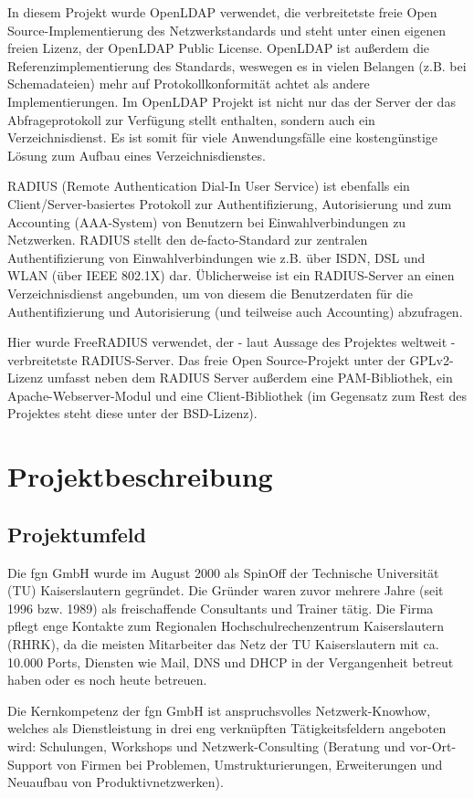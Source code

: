 \documentclass[11pt,a4paper,titlepage=firstiscover,headsepline]{scrartcl} %
\begin{document}
In diesem Projekt wurde OpenLDAP verwendet, die verbreitetste freie Open Source-Implementierung des Netzwerkstandards und steht unter einen eigenen freien Lizenz, der OpenLDAP Public License. OpenLDAP ist außerdem die Referenzimplementierung des Standards, weswegen es in vielen Belangen (z.B. bei Schemadateien) mehr auf Protokollkonformität achtet als andere Implementierungen. Im OpenLDAP Projekt ist nicht nur das der Server der das Abfrageprotokoll zur Verfügung stellt enthalten, sondern auch ein Verzeichnisdienst. Es ist somit für viele Anwendungsfälle eine kostengünstige Lösung zum Aufbau eines Verzeichnisdienstes.

RADIUS (Remote Authentication Dial-In User Service) ist ebenfalls ein Client/Server-basiertes Protokoll zur Authentifizierung, Autorisierung und zum Accounting (AAA-System) von Benutzern bei Einwahlverbindungen zu Netzwerken. RADIUS stellt den de-facto-Standard zur zentralen Authentifizierung von Einwahlverbindungen wie z.B. über ISDN, DSL und WLAN (über IEEE 802.1X) dar. Üblicherweise ist ein RADIUS-Server an einen Verzeichnisdienst angebunden, um von diesem die Benutzerdaten für die Authentifizierung und Autorisierung (und teilweise auch Accounting) abzufragen.

Hier wurde FreeRADIUS verwendet, der - laut Aussage des Projektes weltweit - verbreitetste RADIUS-Server. Das freie Open Source-Projekt unter der GPLv2-Lizenz umfasst neben dem RADIUS Server außerdem eine PAM-Bibliothek, ein Apache-Webserver-Modul und eine Client-Bibliothek (im Gegensatz zum Rest des Projektes steht diese unter der BSD-Lizenz).

\section{Projektbeschreibung}
\subsection{Projektumfeld}
Die fgn GmbH wurde im August 2000 als SpinOff der Technische Universität (TU) Kaiserslautern gegründet. Die Gründer waren zuvor mehrere Jahre (seit 1996 bzw. 1989) als freischaffende Consultants und Trainer tätig. Die Firma pflegt enge Kontakte zum Regionalen Hochschulrechenzentrum Kaiserslautern (RHRK), da die meisten Mitarbeiter das Netz der TU Kaiserslautern mit ca. 10.000 Ports, Diensten wie Mail, DNS und DHCP in der Vergangenheit betreut haben oder es noch heute betreuen.

Die Kernkompetenz der fgn GmbH ist anspruchsvolles Netzwerk-Knowhow, welches als Dienstleistung in drei eng verknüpften Tätigkeitsfeldern angeboten wird: Schulungen, Workshops und Netzwerk-Consulting (Beratung und vor-Ort-Support von Firmen bei Problemen, Umstrukturierungen, Erweiterungen und Neuaufbau von Produktivnetzwerken).
\end{document}
